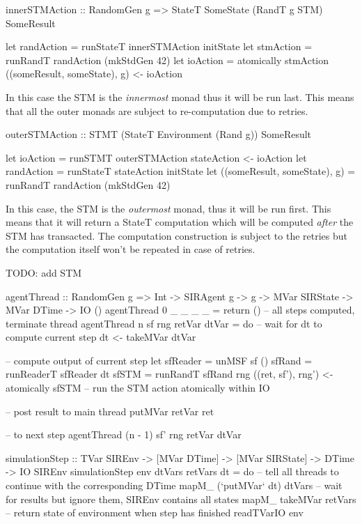 \begin{HaskellCode}

\end{HaskellCode}



\begin{HaskellCode}
innerSTMAction :: RandomGen g => StateT SomeState (RandT g STM) SomeResult

let randAction = runStateT innerSTMAction initState
let stmAction  = runRandT randAction (mkStdGen 42)
let ioAction   = atomically stmAction
((someResult, someState), g) <- ioAction
\end{HaskellCode}

In this case the STM is the \textit{innermost} monad thus it will be run last. This means that all the outer monads are subject to re-computation due to retries.

\begin{HaskellCode}
outerSTMAction :: STMT (StateT Environment (Rand g)) SomeResult

let ioAction = runSTMT outerSTMAction
stateAction <- ioAction
let randAction = runStateT stateAction initState
let ((someResult, someState), g) = runRandT randAction (mkStdGen 42)
\end{HaskellCode}

In this case, the STM is the \textit{outermost} monad, thus it will be run first. This means that it will return a StateT computation which will be computed \textit{after} the STM has transacted. The computation construction is subject to the retries but the computation itself won't be repeated in case of retries.

TODO: add STM

\begin{HaskellCode}
agentThread :: RandomGen g 
            => Int
            -> SIRAgent g
            -> g
            -> MVar SIRState
            -> MVar DTime
            -> IO ()
agentThread 0 _ _ _ _ = return () -- all steps computed, terminate thread
agentThread n sf rng retVar dtVar = do
  -- wait for dt to compute current step
  dt <- takeMVar dtVar

  -- compute output of current step
  let sfReader = unMSF sf ()
      sfRand   = runReaderT sfReader dt
      sfSTM    = runRandT sfRand rng
  ((ret, sf'), rng') <- atomically sfSTM -- run the STM action atomically within IO

  -- post result to main thread
  putMVar retVar ret
  
  -- to next step
  agentThread (n - 1) sf' rng retVar dtVar
\end{HaskellCode}

\begin{HaskellCode}
simulationStep :: TVar SIREnv
               -> [MVar DTime]
               -> [MVar SIRState]
               -> DTime
               -> IO SIREnv
simulationStep env dtVars retVars dt = do
  -- tell all threads to continue with the corresponding DTime
  mapM_ (`putMVar` dt) dtVars
  -- wait for results but ignore them, SIREnv contains all states
  mapM_ takeMVar retVars
  -- return state of environment when step has finished
  readTVarIO env
\end{HaskellCode}